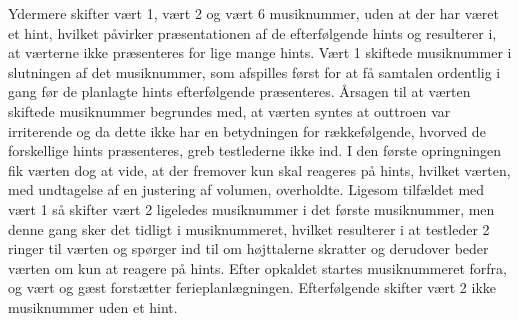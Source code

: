 Ydermere skifter vært 1, vært 2 og vært 6 musiknummer, uden at der har været et hint, hvilket påvirker præsentationen af de efterfølgende hints og resulterer i, at værterne ikke præsenteres for lige mange hints. Vært 1 skiftede musiknummer i slutningen af det musiknummer, som afspilles først for at få samtalen ordentlig i gang før de planlagte hints efterfølgende præsenteres. Årsagen til at værten skiftede musiknummer begrundes med, at værten syntes at outtroen var irriterende og da dette ikke har en betydningen for rækkefølgende, hvorved de forskellige hints præsenteres, greb testlederne ikke ind. I den første opringningen fik værten dog at vide, at der fremover kun skal reageres på hints, hvilket værten, med undtagelse af en justering af volumen, overholdte. Ligesom tilfældet med vært 1 så skifter vært 2 ligeledes musiknummer i det første musiknummer, men denne gang sker det tidligt i musiknummeret, hvilket resulterer i at testleder 2 ringer til værten og spørger ind til om højttalerne skratter og derudover beder værten om kun at reagere på hints. Efter opkaldet startes musiknummeret forfra, og vært og gæst forstætter ferieplanlægningen. Efterfølgende skifter vært 2 ikke musiknummer uden et hint.    

